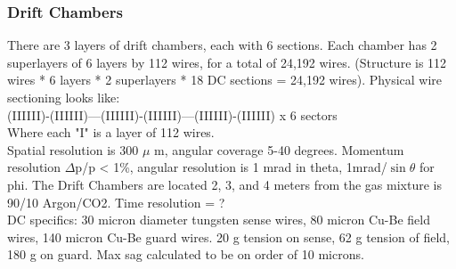         \subsubsection{Drift Chambers}
            There are 3 layers of drift chambers, each with 6 sections. Each chamber has 2 superlayers of 6 layers by 112 wires, for a total of 24,192 wires. (Structure is 112 wires * 6 layers * 2 superlayers * 18 DC sections = 24,192 wires). Physical wire sectioning looks like:\\
            (IIIIII)-(IIIIII)---(IIIIII)-(IIIIII)---(IIIIII)-(IIIIII) x 6 sectors\\
            Where each "I" is a layer of 112 wires.\\
            Spatial resolution is 300 $\mu$ m, angular coverage 5-40 degrees. Momentum resolution $\Delta$p/p < 1\%, angular resolution is 1 mrad in theta, 1mrad/$\sin{\theta}$ for phi. The Drift Chambers are located 2, 3, and 4 meters from the gas mixture is 90/10 Argon/CO2. Time resolution = ?\\
            DC specifics: 30 micron diameter tungsten sense wires, 80 micron Cu-Be field wires, 140 micron Cu-Be guard wires. 20 g tension on sense, 62 g tension of field, 180 g on guard. Max sag calculated to be on order of 10 microns.
            
